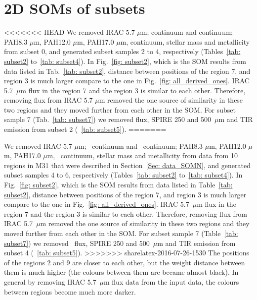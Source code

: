 \newpage
\appendix
\section{2D SOMs of subsets}
\label{sec: app_2d_soms_SOMN}

<<<<<<< HEAD
        We removed IRAC 5.7 $\mu$m; \sii continuum and \oiii continuum; PAH8.3 $\mu$m, PAH12.0 $\mu$m, PAH17.0 $\mu$m, \oiii continuum, stellar mass and metallicity from subset 0, and generated subset samples 2 to 4, respectively (Tables~\ref{tab: subset2} to~\ref{tab: subset4}).
        In Fig.~\ref{fig: subset2}, which is the SOM results from data listed in Tab.~\ref{tab: subset2}, distance between positions of the region 7, and region 3 is much larger compare to the one in Fig.~\ref{fig: all_derived_ones}. 
        IRAC 5.7~$\mu$m flux in the region 7 and the region 3 is similar to each other. 
        Therefore, removing flux from IRAC 5.7 $\mu$m removed the one source of similarity in these two regions and they moved further from each other in the SOM.
        For subset sample 7 (Tab.~\ref{tab: subset7}) we removed \sii flux, SPIRE 250 and 500~$\mu$m and TIR emission from subset 2 (~\ref{tab: subset5}).
=======
      
        We removed IRAC 5.7 $\mu$m; \sii~continuum and \oiii~continuum; PAH8.3 $\mu$m, PAH12.0 $\mu$m, PAH17.0 $\mu$m, \oiii~continuum, stellar mass and metallicity from data from 10 regions in M31 that were described in Section~\ref{Sec: data_SOMN}, and generated subset samples 4 to 6, respectively (Tables~\ref{tab: subset2} to~\ref{tab: subset4}).
        In Fig.~\ref{fig: subset2}, which is the SOM results from data listed in Table~\ref{tab: subset2}, distance between positions of the region 7, and region 3 is much larger compare to the one in Fig.~\ref{fig: all_derived_ones}. 
        IRAC 5.7~$\mu$m flux in the region 7 and the region 3 is similar to each other. 
        Therefore, removing flux from IRAC 5.7~$\mu$m removed the one source of similarity in these two regions and they moved further from each other in the SOM.
        For subset sample 7 (Table~\ref{tab: subset7}) we removed \sii~flux, SPIRE 250 and 500~$\mu$m and TIR emission from subset 4 (~\ref{tab: subset5}).
>>>>>>> sharelatex-2016-07-26-1530
        The positions of the regions 2 and 9 are closer to each other, but the weight distance between them is much higher (the colours between them are became almost black). 
        In general by removing IRAC 5.7~$\mu$m flux data from the input data, the colours between regions become much more darker.
      
